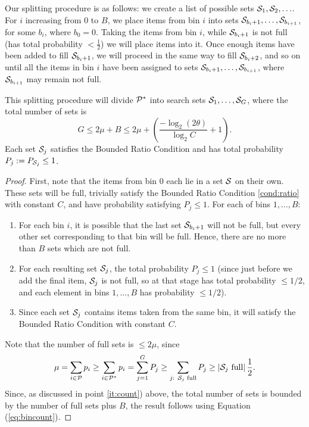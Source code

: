 Our splitting procedure is as follows: we create a list of
possible sets ${\mathcal{S}}_1, {\mathcal{S}}_2, \ldots $. For $i$ increasing from $0$ to $B$,
we place items from bin $i$ into sets ${\mathcal{S}}_{b_{i}+1}, \ldots, {\mathcal{S}}_{b_{i+1}}$, for some $b_i$, where $b_{0} = 0$.
Taking the items 
from bin $i$, while ${\mathcal{S}}_{b_{i}+1}$ is not full  (has 
total probability $< \frac{1}{2}$) we will place  items into it. Once enough items have been added to fill ${\mathcal{S}}_{b_{i} + 1}$,
we will proceed in the same way to fill ${\mathcal{S}}_{b_{i}+2}$, and so on until all the items in bin $i$ have been
assigned to sets ${\mathcal{S}}_{b_{i}+1}, \ldots, {\mathcal{S}}_{b_{i+1}}$,  where ${\mathcal{S}}_{b_{i+1}}$ may remain not full.
%
\begin{proposition} \label{prop:splitting}
 This splitting procedure will divide ${\mathcal{P}}^*$ into search sets ${\mathcal{S}}_1, \ldots, {\mathcal{S}}_G$, where
the total number of sets is 
$$ G \leq 2 \mu + B \leq 2 \mu  +  \left( \frac{ -\log_2 (2\theta)}{\log_2 C} + 1 \right).$$ 
Each set ${\mathcal{S}}_j$ satisfies the Bounded Ratio Condition and has total probability $P_j := P_{{\mathcal{S}}_j} \leq 1$. \end{proposition}
\begin{proof}
First, note that  
the items from bin $0$ each lie in a set ${\mathcal{S}}$ on their own.
These sets will be full, trivially satisfy the Bounded Ratio Condition \ref{cond:ratio}
with constant $C$,
 and have probability satisfying $P_j \leq 1$.
 For each of bins $1, \ldots, B$:
\begin{enumerate}
\item  \label{it:count} For each bin $i$,
it is possible that the last set ${\mathcal{S}}_{b_{i}+1}$  will not be full, but every other
set corresponding to that bin will be full. Hence, there are no more than $B$ sets which are not full.
\item For each resulting set ${\mathcal{S}}_j$, the total probability $P_j \leq 1$ (since just before we add the final item, ${\mathcal{S}}_j$ is not full, so at
that stage has total probability $\leq 1/2$, and each element in bins $1, \ldots, B$ has probability $\leq 1/2$).
\item Since each set ${\mathcal{S}}_j$ contains items  taken from the same bin, it will satisfy the Bounded Ratio Condition  with 
constant $C$.
\end{enumerate}

 Note that the number of full sets is \(\leq 2 \mu \), since
\begin{equation} \label{eq:counting}
\mu =  \sum_{i \in {\mathcal{P}}} p_i \geq \sum_{i \in {\mathcal{P}}^*} p_i  = \sum_{j=1}^G P_j
\geq
\sum_ {\mbox{\scriptsize $j$: ${\mathcal{S}}_j$ full}} P_j \geq \left| \mbox{${\mathcal{S}}_j$ full} \right| \frac{1}{2}. \end{equation}
Since, as discussed  in point \ref{it:count}) above,
 the total number of sets is bounded by the number of full sets plus $B$, the result follows using Equation
(\ref{eq:bincount}).
\end{proof}

